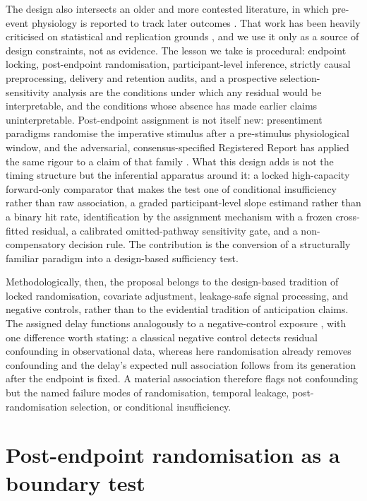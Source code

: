 \documentclass[11pt,a4paper]{article}
\theoremstyle{definition}
\begin{document}
The design also intersects an older and more contested literature, in which
pre-event physiology is reported to track later outcomes
\citep{Bem2011,Mossbridge2012,DugganTressoldi2018}. That work has been heavily
criticised on statistical and replication grounds
\citep{Wagenmakers2011,Galak2012}, and we use it only as a source of design
constraints, not as evidence. The lesson we take is procedural: endpoint locking,
post-endpoint randomisation, participant-level inference, strictly causal
preprocessing, delivery and retention audits, and a prospective
selection-sensitivity analysis are the conditions under which any residual would
be interpretable, and the conditions whose absence has made earlier claims
uninterpretable.
Post-endpoint assignment is not itself new: presentiment paradigms randomise the
imperative stimulus after a pre-stimulus physiological window, and the
adversarial, consensus-specified Registered Report has applied the same rigour to
a claim of that family \citep{Kekecs2023}. What this design adds is not the timing
structure but the inferential apparatus around it: a locked high-capacity
forward-only comparator that makes the test one of conditional insufficiency
rather than raw association, a graded participant-level slope estimand rather than
a binary hit rate, identification by the assignment mechanism with a frozen
cross-fitted residual, a calibrated omitted-pathway sensitivity gate, and a
non-compensatory decision rule. The contribution is the conversion of a
structurally familiar paradigm into a design-based sufficiency test.

Methodologically, then, the proposal belongs to the design-based tradition of
locked randomisation, covariate adjustment, leakage-safe signal processing, and
negative controls, rather than to the evidential tradition of anticipation
claims. 
The assigned delay functions analogously to a negative-control exposure
\citep{Lipsitch2010,Shi2020}, with one difference worth stating: a classical
negative control detects residual confounding in observational data, whereas here
randomisation already removes confounding and the delay's expected null association
follows from its generation after the endpoint is fixed. A material association
therefore flags not confounding but the named failure modes of randomisation,
temporal leakage, post-randomisation selection, or conditional insufficiency.

\section{Post-endpoint randomisation as a boundary test}
\label{sec:post-endpoint-randomisation}
\end{document}
